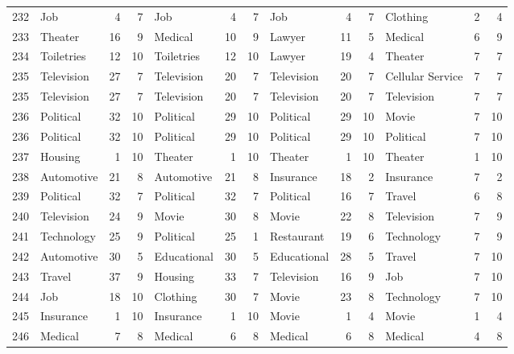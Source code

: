 \begin{figure}[htbp]
\begin{tabular}{rlrrlrrlrrlrr}
    232   & Job   & 4     & 7     & Job   & 4     & 7     & Job   & 4     & 7     & Clothing & 2     & 4 \\
    233   & Theater & 16    & 9     & Medical & 10    & 9     & Lawyer & 11    & 5     & Medical & 6     & 9 \\
    234   & Toiletries & 12    & 10    & Toiletries & 12    & 10    & Lawyer & 19    & 4     & Theater & 7     & 7 \\
    235   & Television & 27    & 7     & Television & 20    & 7     & Television & 20    & 7     & Cellular Service & 7     & 7 \\
    235   & Television & 27    & 7     & Television & 20    & 7     & Television & 20    & 7     & Television & 7     & 7 \\
    236   & Political & 32    & 10    & Political & 29    & 10    & Political & 29    & 10    & Movie & 7     & 10 \\
    236   & Political & 32    & 10    & Political & 29    & 10    & Political & 29    & 10    & Political & 7     & 10 \\
    237   & Housing & 1     & 10    & Theater & 1     & 10    & Theater & 1     & 10    & Theater & 1     & 10 \\
    238   & Automotive & 21    & 8     & Automotive & 21    & 8     & Insurance & 18    & 2     & Insurance & 7     & 2 \\
    239   & Political & 32    & 7     & Political & 32    & 7     & Political & 16    & 7     & Travel & 6     & 8 \\
    240   & Television & 24    & 9     & Movie & 30    & 8     & Movie & 22    & 8     & Television & 7     & 9 \\
    241   & Technology & 25    & 9     & Political & 25    & 1     & Restaurant & 19    & 6     & Technology & 7     & 9 \\
    242   & Automotive & 30    & 5     & Educational & 30    & 5     & Educational & 28    & 5     & Travel & 7     & 10 \\
    243   & Travel & 37    & 9     & Housing & 33    & 7     & Television & 16    & 9     & Job   & 7     & 10 \\
    244   & Job   & 18    & 10    & Clothing & 30    & 7     & Movie & 23    & 8     & Technology & 7     & 10 \\
    245   & Insurance & 1     & 10    & Insurance & 1     & 10    & Movie & 1     & 4     & Movie & 1     & 4 \\
    246   & Medical & 7     & 8     & Medical & 6     & 8     & Medical & 6     & 8     & Medical & 4     & 8 \\

\end{tabular}
\end{figure}
